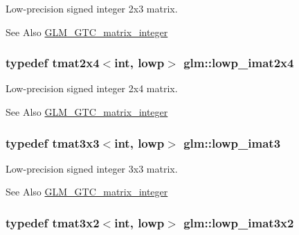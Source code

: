 Low-\/precision signed integer 2x3 matrix. \begin{DoxySeeAlso}{See Also}
\hyperlink{group__gtc__matrix__integer}{G\-L\-M\-\_\-\-G\-T\-C\-\_\-matrix\-\_\-integer} 
\end{DoxySeeAlso}
\hypertarget{group__gtc__matrix__integer_gaf664d339f1b66e62ed07c913e60be940}{
\subsubsection[{lowp\-\_\-imat2x4}]{\setlength{\rightskip}{0pt plus 5cm}typedef tmat2x4$<$int, lowp$>$ {\bf glm\-::lowp\-\_\-imat2x4}}}\label{group__gtc__matrix__integer_gaf664d339f1b66e62ed07c913e60be940}
Low-\/precision signed integer 2x4 matrix. \begin{DoxySeeAlso}{See Also}
\hyperlink{group__gtc__matrix__integer}{G\-L\-M\-\_\-\-G\-T\-C\-\_\-matrix\-\_\-integer} 
\end{DoxySeeAlso}
\hypertarget{group__gtc__matrix__integer_ga2f7d17630aa9e27bb9e62f98603a4d7e}{
\subsubsection[{lowp\-\_\-imat3}]{\setlength{\rightskip}{0pt plus 5cm}typedef tmat3x3$<$int, lowp$>$ {\bf glm\-::lowp\-\_\-imat3}}}\label{group__gtc__matrix__integer_ga2f7d17630aa9e27bb9e62f98603a4d7e}
Low-\/precision signed integer 3x3 matrix. \begin{DoxySeeAlso}{See Also}
\hyperlink{group__gtc__matrix__integer}{G\-L\-M\-\_\-\-G\-T\-C\-\_\-matrix\-\_\-integer} 
\end{DoxySeeAlso}
\hypertarget{group__gtc__matrix__integer_ga93514d2df726334e6d5edd373635d343}{
\subsubsection[{lowp\-\_\-imat3x2}]{\setlength{\rightskip}{0pt plus 5cm}typedef tmat3x2$<$int, lowp$>$ {\bf glm\-::lowp\-\_\-imat3x2}}}\label{group__gtc__matrix__integer_ga93514d2df726334e6d5edd373635d343}
